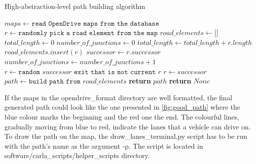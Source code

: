 \vspace*{1em}
\begin{algorithm}
\caption{High-abstraction-level path building algorithm}
  \begin{algorithmic}
      \State $maps\gets \texttt{read OpenDrive maps from the database}$
            \State $r\gets \texttt{randomly pick a road element from the map}$
            \State $road\_elements \gets \texttt{[]}$
            \State $total\_length\gets 0$
            \State $number\_of\_junctions\gets 0$
                \State $total\_length \gets total\_length + r.length$
                \State $road\_elements.insert(r)$
                \State $successor \gets r.successor$
                    \State $number\_of\_junctions\gets number\_of\_junctions + 1$
                    \State $r \gets \texttt{random } successor \texttt{ exit that is not current } r$
                \EndIf
                    \State $r \gets successor$
                \EndIf
            \EndWhile\label{euclidendwhile}
            \State $path \gets \texttt{build path from } road\_elements$
                    \State \textbf{return} $path$
            \EndIf
        \EndIf
      \EndFor
      \State \textbf{return} $None$
    \EndProcedure
  \end{algorithmic}
\end{algorithm}

If the maps in the opendrive\_format directory are well formatted, the final generated path could look like the one presented in \autoref{fig:good_path} where the blue colour marks the beginning and the red one the end. The colourful lines, gradually moving from blue to red, indicate the lanes that a vehicle can drive on. To draw the path on the map, the draw\_lanes\_terminal.py script has to be run with the path's name as the argument -p. The script is located in software/carla\_scripts/helper\_scripts directory.

